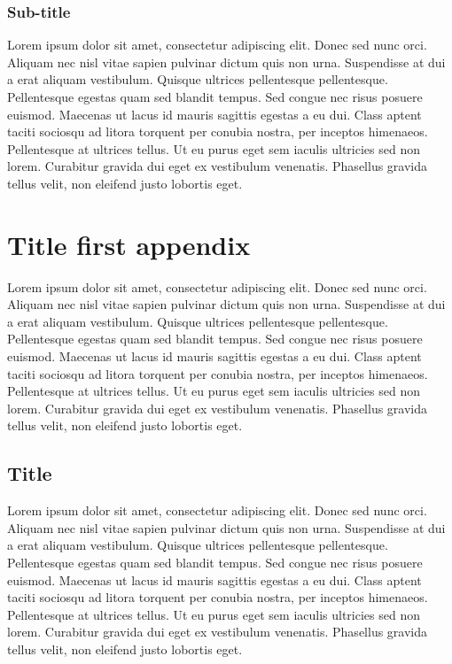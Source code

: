 \subsection{Sub-title}
Lorem ipsum dolor sit amet, consectetur adipiscing elit. Donec sed nunc orci.
Aliquam nec nisl vitae sapien pulvinar dictum quis non urna. Suspendisse at dui a
erat aliquam vestibulum. Quisque ultrices pellentesque pellentesque. Pellentesque
egestas quam sed blandit tempus. Sed congue nec risus posuere euismod. Maecenas ut
lacus id mauris sagittis egestas a eu dui. Class aptent taciti sociosqu ad
litora torquent per conubia nostra, per inceptos himenaeos. Pellentesque at
ultrices tellus. Ut eu purus eget sem iaculis ultricies sed non lorem. Curabitur
gravida dui eget ex vestibulum venenatis. Phasellus gravida tellus velit, non
eleifend justo lobortis eget.

\chapter{Title first appendix}


Lorem ipsum dolor sit amet, consectetur adipiscing elit. Donec sed nunc orci. Aliquam
nec nisl vitae sapien pulvinar dictum quis non urna. Suspendisse at dui a erat
aliquam vestibulum. Quisque ultrices pellentesque pellentesque. Pellentesque
egestas quam sed blandit tempus. Sed congue nec risus posuere euismod. Maecenas
ut lacus id mauris sagittis egestas a eu dui. Class aptent taciti sociosqu ad litora
torquent per conubia nostra, per inceptos himenaeos. Pellentesque at ultrices tellus.
Ut eu purus eget sem iaculis ultricies sed non lorem. Curabitur gravida dui eget
ex vestibulum venenatis. Phasellus gravida tellus velit, non eleifend justo lobortis
eget.

\section{Title}
Lorem ipsum dolor sit amet, consectetur adipiscing elit. Donec sed nunc orci.
Aliquam nec nisl vitae sapien pulvinar dictum quis non urna. Suspendisse at dui a
erat aliquam vestibulum. Quisque ultrices pellentesque pellentesque. Pellentesque
egestas quam sed blandit tempus. Sed congue nec risus posuere euismod. Maecenas ut
lacus id mauris sagittis egestas a eu dui. Class aptent taciti sociosqu ad
litora torquent per conubia nostra, per inceptos himenaeos. Pellentesque at
ultrices tellus. Ut eu purus eget sem iaculis ultricies sed non lorem. Curabitur
gravida dui eget ex vestibulum venenatis. Phasellus gravida tellus velit, non
eleifend justo lobortis eget.

